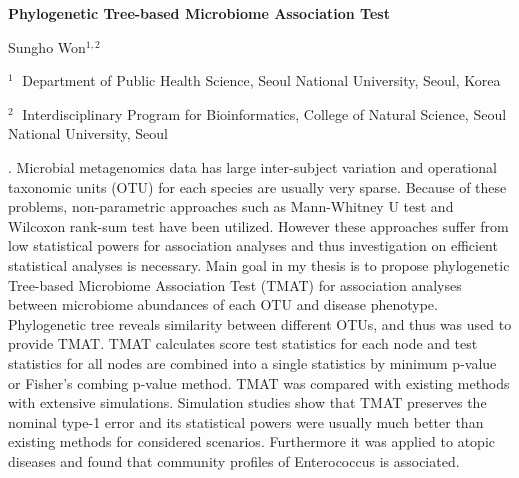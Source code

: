\documentclass[12pt]{article}
\begin{document}
\begin{flushleft}


{\LARGE\bf Phylogenetic Tree-based Microbiome Association Test}


\vspace{1.0cm}

Sungho Won$^{1,2}$

\begin{description}

\item $^1 \;$ Department of Public Health Science, Seoul National University,
Seoul, Korea

\item $^2 \;$ Interdisciplinary Program for Bioinformatics, College of Natural Science, Seoul National University, Seoul



\end{description}

\end{flushleft}


\vspace{0.75cm}

. Microbial metagenomics data has large inter-subject variation and operational taxonomic units (OTU) for each species are usually very sparse. Because of these problems, non-parametric approaches such as Mann-Whitney U test and Wilcoxon rank-sum test have been utilized. However these approaches suffer from low statistical powers for association analyses and thus investigation on efficient statistical analyses is necessary. Main goal in my thesis is to propose phylogenetic Tree-based Microbiome Association Test (TMAT) for association analyses between microbiome abundances of each OTU and disease phenotype. Phylogenetic tree reveals similarity between different OTUs, and thus was used to provide TMAT. TMAT calculates score test statistics for each node and test statistics for all nodes are combined into a single statistics by minimum p-value or Fisher's combing p-value method. TMAT was compared with existing methods with extensive simulations. Simulation studies show that TMAT preserves the nominal type-1 error and its statistical powers were usually much better than existing methods for considered scenarios. Furthermore it was applied to atopic diseases and found that community profiles of Enterococcus is associated.
\vskip 2mm
\end{document}
